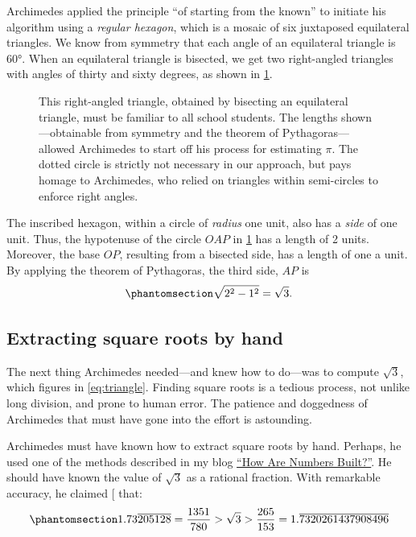 \documentclass[
  a4paper,
]{article}
\begin{document}
Archimedes applied the principle ``of starting from the known'' to
initiate his algorithm using a \emph{regular hexagon}, which is a mosaic
of six juxtaposed equilateral triangles. We know from symmetry that each
angle of an equilateral triangle is \(60°\). When an equilateral
triangle is bisected, we get two right-angled triangles with angles of
thirty and sixty degrees, as shown in \cref{fig:thirty-sixty}.

\begin{figure}
\centering

\caption{This right-angled triangle, obtained by bisecting an
equilateral triangle, must be familiar to all school students. The
lengths shown---obtainable from symmetry and the theorem of
Pythagoras---allowed Archimedes to start off his process for estimating
\(\pi\). The dotted circle is strictly not necessary in our approach,
but pays homage to Archimedes, who relied on triangles within
semi-circles to enforce right angles.}\label{fig:thirty-sixty}
\end{figure}

The inscribed hexagon, within a circle of \emph{radius} one unit, also
has a \emph{side} of one unit. Thus, the hypotenuse of the circle
\(OAP\) in \cref{fig:thirty-sixty} has a length of 2 units. Moreover,
the base \(OP\), resulting from a bisected side, has a length of one a
unit. By applying the theorem of Pythagoras, the third side, \(AP\) is
\begin{equation}\phantomsection\label{eq:triangle}{
\sqrt{2^2 - 1^2} = \sqrt{3}.
}\end{equation}

\subsection{Extracting square roots by
hand}\label{extracting-square-roots-by-hand}

The next thing Archimedes needed---and knew how to do---was to compute
\(\sqrt{3}\), which figures in \cref{eq:triangle}. Finding square roots
is a tedious process, not unlike long division, and prone to human
error. The patience and doggedness of Archimedes that must have gone
into the effort is astounding.

Archimedes must have known how to extract square roots by hand. Perhaps,
he used one of the methods described in my blog
\href{https://swanlotus.netlify.app/blogs/how-are-numbers-built}{``How
Are Numbers Built?''}. He should have known the value of \(\sqrt{3}\) as
a rational fraction. With remarkable accuracy, he claimed
{[}\citeproc{ref-heath2002}{4}{]} that:
\begin{equation}\phantomsection\label{eq:sqrt3}{
1.73\overline{205128} = \frac{1351}{780} > \sqrt{3} > \frac{265}{153} = 1.\overline{7320261437908496}
}\end{equation}
\end{document}
